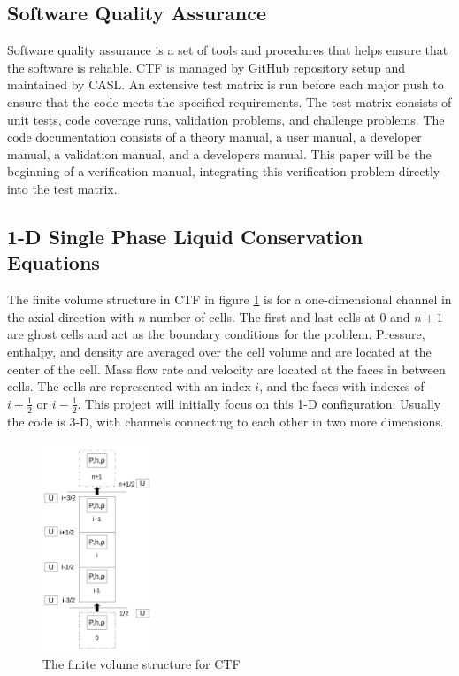 \documentclass{mc2015}
\begin{document}
\subsection{Software Quality Assurance}

Software quality assurance is a set of tools and procedures that helps
ensure that the software is reliable. CTF is managed by GitHub repository
setup and maintained by CASL. An extensive test matrix is run before each major
push to ensure that the code meets the specified requirements. The test matrix
consists of unit tests, code coverage runs, validation problems, and challenge
problems. The code documentation consists of a theory manual, a user manual, a
developer manual, a validation manual, and a developers manual. This paper
will be the beginning of a verification manual, integrating this verification
problem directly into the test matrix.

\subsection{1-D Single Phase Liquid Conservation Equations}

The finite volume structure in CTF in figure \ref{fig:CTF-Cells} is for a
one-dimensional channel in the axial direction with $n$ number of cells. The
first and last cells at 0 and $n+1$ are ghost cells and act as the boundary
conditions for the problem. Pressure, enthalpy, and density are averaged over
the cell volume and are located at the center of the cell. Mass flow rate and
velocity are located at the faces in between cells. The cells  are represented
with an index $i$, and the faces with indexes of $i + \frac{1}{2}$ or 
$i-\frac{1}{2}$. This project will initially focus on this 1-D configuration.
Usually the code  is 3-D,  with channels connecting to each other in two more 
dimensions.

\begin{figure}[!h]
	\centering
	\includegraphics[width=0.30\textwidth]{images/CTF-Cells}
	\caption{The finite volume structure for CTF}
	\label{fig:CTF-Cells}
\end{figure}
\end{document}
